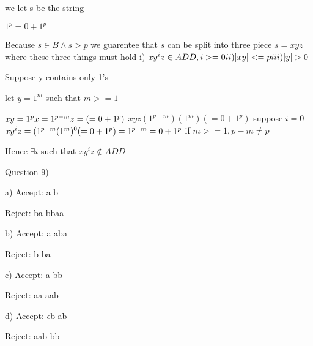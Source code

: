 \documentclass{article}
\begin{document}
we let s be the string

$1^p = 0 + 1^p$

Because $s \in B \land s > p$ we guarentee that $s$ can be split into three piece $s = xyz$
\newline
where these three things must hold 
\newline
i) $xy^iz \in ADD    ,i>=0
\newline
ii) |xy| <= p
\newline
iii) |y| > 0$


Suppose y contains only 1's

let $y = 1^m$ such that $m >= 1$

$
xy = 1^p\newline
x = 1^{p-m}\newline
z = ( = 0 + 1^p)
$
\newline
$
xyz     (1^{p-m})(1^m)(= 0 + 1^p)
$
\newline
suppose $i = 0$
\newline
$
xy^iz = (1^{p-m}(1^m)^0( = 0 + 1^p)
\newline
      = 1^{p-m} = 0 + 1^p
$
\newline
if $m>=1, p-m \neq p$

Hence $\exists i$ such that $xy^iz \notin ADD$


\newpage
Question 9)

a)\newline
Accept:\newline
a\newline
b

Reject:\newline
ba\newline
bbaa


b)\newline
Accept:\newline
a\newline 
aba\newline  

Reject:\newline
b\newline 
ba\newline 


c)\newline
Accept:\newline
a\newline 
bb  

Reject:\newline
aa\newline  
aab\newline  


d)\newline
Accept:\newline
$\epsilon$b\newline 
ab 

Reject:\newline
aab\newline
bb
\end{document}
